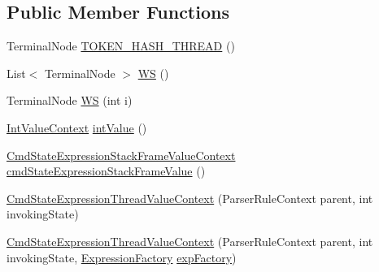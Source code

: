 \subsection*{Public Member Functions}
\begin{DoxyCompactItemize}
\item 
Terminal\+Node \hyperlink{classgov_1_1nasa_1_1jpf_1_1inspector_1_1server_1_1expression_1_1parser_1_1_expression_grammar_pa5a19a4a13564890289bc65b6a0372f78_a8715b117ea4923f536716ca0e45da09c}{T\+O\+K\+E\+N\+\_\+\+H\+A\+S\+H\+\_\+\+T\+H\+R\+E\+AD} ()
\item 
List$<$ Terminal\+Node $>$ \hyperlink{classgov_1_1nasa_1_1jpf_1_1inspector_1_1server_1_1expression_1_1parser_1_1_expression_grammar_pa5a19a4a13564890289bc65b6a0372f78_ac27e3dcf4825cebf6affac49061010e9}{WS} ()
\item 
Terminal\+Node \hyperlink{classgov_1_1nasa_1_1jpf_1_1inspector_1_1server_1_1expression_1_1parser_1_1_expression_grammar_pa5a19a4a13564890289bc65b6a0372f78_a65bb7f706fbbeae6b6b1468601bdc4e3}{WS} (int i)
\item 
\hyperlink{classgov_1_1nasa_1_1jpf_1_1inspector_1_1server_1_1expression_1_1parser_1_1_expression_grammar_parser_1_1_int_value_context}{Int\+Value\+Context} \hyperlink{classgov_1_1nasa_1_1jpf_1_1inspector_1_1server_1_1expression_1_1parser_1_1_expression_grammar_pa5a19a4a13564890289bc65b6a0372f78_a1e61548d4363a4ca538e51dfe15c71c3}{int\+Value} ()
\item 
\hyperlink{classgov_1_1nasa_1_1jpf_1_1inspector_1_1server_1_1expression_1_1parser_1_1_expression_grammar_pa27eac9bb10e329b6f1427633e5ce16ca}{Cmd\+State\+Expression\+Stack\+Frame\+Value\+Context} \hyperlink{classgov_1_1nasa_1_1jpf_1_1inspector_1_1server_1_1expression_1_1parser_1_1_expression_grammar_pa5a19a4a13564890289bc65b6a0372f78_a6d1709c1886c7dce3bfb82fb303149e6}{cmd\+State\+Expression\+Stack\+Frame\+Value} ()
\item 
\hyperlink{classgov_1_1nasa_1_1jpf_1_1inspector_1_1server_1_1expression_1_1parser_1_1_expression_grammar_pa5a19a4a13564890289bc65b6a0372f78_a19f0835b59d8a1ae995f2cae1f651a92}{Cmd\+State\+Expression\+Thread\+Value\+Context} (Parser\+Rule\+Context parent, int invoking\+State)
\item 
\hyperlink{classgov_1_1nasa_1_1jpf_1_1inspector_1_1server_1_1expression_1_1parser_1_1_expression_grammar_pa5a19a4a13564890289bc65b6a0372f78_ab5fd88551a133fb8a9c846d6c7f9d624}{Cmd\+State\+Expression\+Thread\+Value\+Context} (Parser\+Rule\+Context parent, int invoking\+State, \hyperlink{classgov_1_1nasa_1_1jpf_1_1inspector_1_1server_1_1expression_1_1_expression_factory}{Expression\+Factory} \hyperlink{classgov_1_1nasa_1_1jpf_1_1inspector_1_1server_1_1expression_1_1parser_1_1_expression_grammar_pa5a19a4a13564890289bc65b6a0372f78_ae77f4cc529ba5a30fa3c524134a32042}{exp\+Factory})

\end{DoxyCompactItemize}
